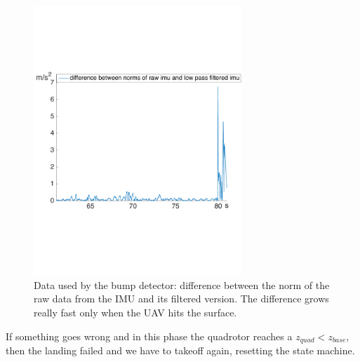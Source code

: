 \begin{figure}[!htbp]
    \centering
    \includegraphics[width=0.7\textwidth]{img/imu_landing.pdf}
    \caption{Data used by the bump detector: difference between the norm of the raw data from the IMU and its filtered version. The difference grows really fast only when the UAV hits the surface.}
    \label{fig:imu_landing}
\end{figure}
 
If something goes wrong and in this phase the quadrotor reaches a $z_{quad} < z_{base}$, then the landing failed and we have to takeoff again, resetting the state machine.
